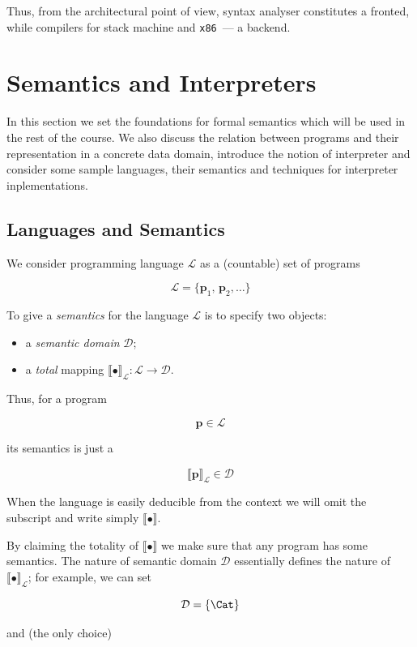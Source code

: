 \documentclass{book}
\newcommand{\sembr}[1]{\llbracket{#1}\rrbracket}
\newcommand{\primi}[1]{\mathbf{#1}}
\newcommand{\ph}{{\phantom{x}}}
\begin{document}
Thus, from the architectural point of view, syntax analyser constitutes a fronted, while compilers for
stack machine and \texttt{x86}~--- a backend.

\chapter{Semantics and Interpreters}

In this section we set the foundations for formal semantics which will be used in the rest of the course. We also discuss the
relation between programs and their representation in a concrete data domain, introduce the notion of interpreter and
consider some sample languages, their semantics and techniques for interpreter inplementations.

\section{Languages and Semantics}

We consider programming language $\mathcal L$ as a (countable) set of programs

\[
\mathcal{L}=\{\primi{p}_1,\,\primi{p}_2,\dots\}
\]

To give a \emph{semantics} for the language $\mathcal L$ is to specify two objects:

\begin{itemize}
\item a \emph{semantic domain} $\mathcal D$;
\item a \emph{total} mapping $\sembr{\bullet}^\ph_{\mathcal L} : \mathcal L \to \mathcal D$.
\end{itemize}

Thus, for a program

\[
\primi{p}\in\mathcal L
\]

its semantics is just a

\[
\sembr{\primi{p}}^\ph_{\mathcal L}\in\mathcal D
\]

When the language is easily deducible from the context we will omit the subscript and write simply $\sembr{\bullet}$.

By claiming the totality of $\sembr{\bullet}$ we 
make sure that any program has some semantics. The nature of semantic domain $\mathcal D$ essentially defines the nature of $\sembr{\bullet}_{\mathcal L}$;
for example, we can set

\[
\mathcal D=\{\Cat\}
\]

and (the only choice)
\end{document}
